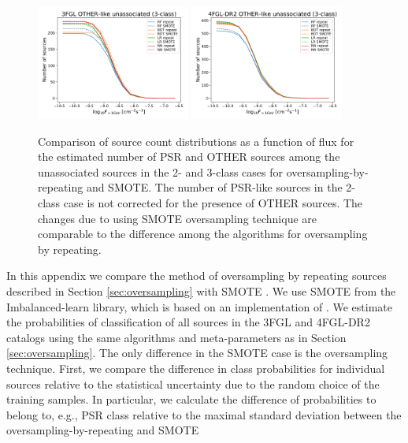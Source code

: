 \documentclass{aa}
\begin{document}
\begin{appendix}
\begin{figure}[h]
\hspace*{-0.5cm}
\includegraphics[width=0.45\textwidth]{plots/oversample/N_logS_3FGL_OTHER_3classes_O_vs_S.pdf}
\hspace*{-0.5cm}
\includegraphics[width=0.45\textwidth]{plots/oversample/N_logS_4FGL-DR2_OTHER_3classes_O_vs_S.pdf}
\caption{Comparison of source count distributions as a function of flux for the estimated number of PSR and OTHER sources
among the unassociated sources in the 2- and 3-class cases for oversampling-by-repeating and SMOTE.
The number of PSR-like sources in the 2-class case is not corrected for the presence of OTHER sources.
The changes due to using SMOTE oversampling technique are comparable to the difference among the algorithms
for oversampling by repeating.
}
\label{fig:S_vs_O_NlogS}
\end{figure}

In this appendix we compare the method of oversampling by repeating sources described in Section \ref{sec:oversampling} 
with SMOTE \citep{Chawla_2002}. We use SMOTE from the Imbalanced-learn library, which is based on an implementation of \citet{Chawla_2002}. 
We estimate the probabilities of classification of all sources in the 3FGL and 4FGL-DR2 catalogs using the same algorithms and meta-parameters as in Section \ref{sec:oversampling}.
The only difference in the SMOTE case is the oversampling technique.
First, we compare the difference in class probabilities for individual sources relative to the statistical uncertainty due to the random choice of the training samples.
In particular, we calculate the difference of probabilities to belong to, e.g., PSR class relative to the maximal standard deviation
between the oversampling-by-repeating and SMOTE


\end{appendix}
\end{document}
